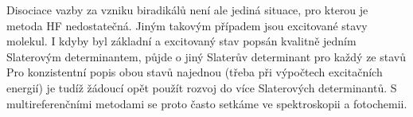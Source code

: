 Disociace vazby za vzniku biradikálů není ale jediná situace, pro kterou je metoda HF nedostatečná. Jiným takovým případem jsou excitované stavy  molekul. I kdyby byl základní a excitovaný stav popsán kvalitně jedním Slaterovým determinantem, půjde o jiný Slaterův determinant pro každý ze stavů Pro konzistentní popis obou stavů najednou (třeba při výpočtech excitačních energií) je tudíž žádoucí opět použít rozvoj do více Slaterových determinantů. S multireferenčními metodami se proto často setkáme ve spektroskopii a fotochemii. 











